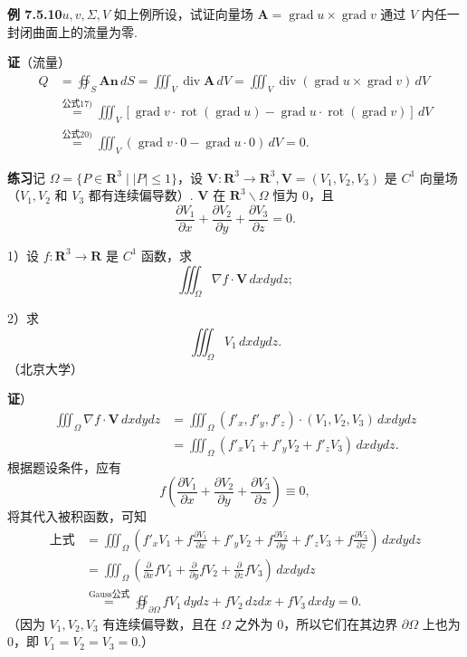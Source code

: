 \documentclass[UTF8,12pt,a4paper,fontset=fandol]{ctexart}
\begin{document}
\noindent\textbf{例 7.5.10}\quad $u,v,\Sigma,V$ 如上例所设，试证向量场 $\mathbf A=\operatorname{grad}u\times\operatorname{grad}v$ 通过 $V$ 内任一封闭曲面上的流量为零.

\noindent\textbf{证}\quad （流量）
\[
\begin{aligned}
Q&=\oiint_S \mathbf A\mathbf n\,dS
=\iiint_V\operatorname{div}\mathbf A\,dV
=\iiint_V\operatorname{div}(\operatorname{grad}u\times\operatorname{grad}v)\,dV\\
&\overset{\text{公式17)}}{=}\iiint_V[\operatorname{grad}v\cdot\operatorname{rot}(\operatorname{grad}u)-\operatorname{grad}u\cdot\operatorname{rot}(\operatorname{grad}v)]\,dV\\
&\overset{\text{公式20)}}{=}\iiint_V(\operatorname{grad}v\cdot0-\operatorname{grad}u\cdot0)\,dV=0.
\end{aligned}
\]

\noindent\textbf{练习}\quad 记 $\Omega=\{P\in\mathbf R^3\mid |P|\leqslant1\}$，设 $\mathbf V:\mathbf R^3\to\mathbf R^3,\mathbf V=(V_1,V_2,V_3)$ 是 $C^1$ 向量场（$V_1,V_2$ 和 $V_3$ 都有连续偏导数）. $\mathbf V$ 在 $\mathbf R^3\backslash\Omega$ 恒为 0，且
\[
\frac{\partial V_1}{\partial x}+\frac{\partial V_2}{\partial y}+\frac{\partial V_3}{\partial z}=0.
\]

1）设 $f:\mathbf R^3\to\mathbf R$ 是 $C^1$ 函数，求
\[
\iiint_\Omega \nabla f\cdot\mathbf V\,dxdy dz;
\]

2）求
\[
\iiint_\Omega V_1\,dxdy dz.
\]
（北京大学）

\noindent\textbf{证}）
\[
\begin{aligned}
\iiint_\Omega \nabla f\cdot\mathbf V\,dxdy dz
&=\iiint_\Omega(f'_x,f'_y,f'_z)\cdot(V_1,V_2,V_3)\,dxdy dz\\
&=\iiint_\Omega(f'_xV_1+f'_yV_2+f'_zV_3)\,dxdy dz.
\end{aligned}
\]
根据题设条件，应有
\[
f\left(\frac{\partial V_1}{\partial x}+\frac{\partial V_2}{\partial y}+\frac{\partial V_3}{\partial z}\right)\equiv0,
\]
将其代入被积函数，可知
\[
\begin{aligned}
\text{上式}
&=\iiint_\Omega\left(f'_xV_1+f\frac{\partial V_1}{\partial x}+f'_yV_2+f\frac{\partial V_2}{\partial y}+f'_zV_3+f\frac{\partial V_3}{\partial z}\right)\,dxdy dz\\
&=\iiint_\Omega\left(\frac\partial{\partial x}fV_1+\frac\partial{\partial y}fV_2+\frac\partial{\partial z}fV_3\right)\,dxdy dz\\
&\overset{\text{Gauss公式}}{=}\oiint_{\partial\Omega}fV_1\,dydz+fV_2\,dzdx+fV_3\,dxdy=0.
\end{aligned}
\]
（因为 $V_1,V_2,V_3$ 有连续偏导数，且在 $\Omega$ 之外为 0，所以它们在其边界 $\partial\Omega$ 上也为 0，即 $V_1=V_2=V_3=0$.）
\end{document}
